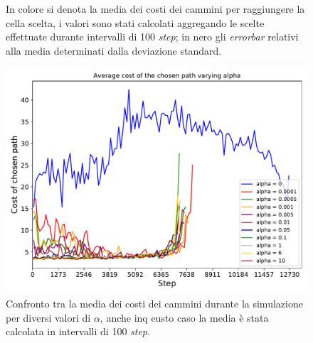 \begin{figure}
\begin{tabular}{cc}
	\end{tabular}
	\caption{In colore si denota la media dei costi dei cammini per raggiungere la cella scelta, i valori sono stati calcolati aggregando le scelte effettuate durante intervalli di 100 \textit{step}; in nero gli \textit{errorbar} relativi alla media determinati dalla deviazione standard.}
	\label{fig:alphaOverTime}
\end{figure}

\begin{figure}
	\centering
	\includegraphics[width=0.9\linewidth]{images/alpha_results/comparison}
	\caption{Confronto tra la media dei costi dei cammini durante la simulazione per diversi valori di $\alpha$, anche inq eusto caso la media è stata calcolata in intervalli di 100 \textit{step}.}
	\label{fig:alphaComparison}
\end{figure}
